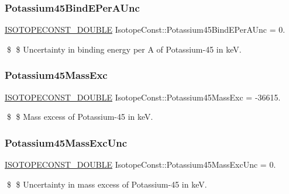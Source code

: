 \subsubsection{\texorpdfstring{Potassium45\+Bind\+E\+Per\+A\+Unc}{Potassium45BindEPerAUnc}}
{\footnotesize\ttfamily \mbox{\hyperlink{group___isotope_const-_macros_ga8f45a7272ce02c0b4c65c44636ed719a}{I\+S\+O\+T\+O\+P\+E\+C\+O\+N\+S\+T\+\_\+\+D\+O\+U\+B\+LE}} Isotope\+Const\+::\+Potassium45\+Bind\+E\+Per\+A\+Unc = 0.}

\$ \$ Uncertainty in binding energy per A of Potassium-\/45 in keV. \mbox{\label{group___isotope_const-_potassium-_k45_gaa8e3ed98c9a9b88cd99843bd8a43a698}} 
\subsubsection{\texorpdfstring{Potassium45\+Mass\+Exc}{Potassium45MassExc}}
{\footnotesize\ttfamily \mbox{\hyperlink{group___isotope_const-_macros_ga8f45a7272ce02c0b4c65c44636ed719a}{I\+S\+O\+T\+O\+P\+E\+C\+O\+N\+S\+T\+\_\+\+D\+O\+U\+B\+LE}} Isotope\+Const\+::\+Potassium45\+Mass\+Exc = -\/36615.}

\$ \$ Mass excess of Potassium-\/45 in keV. \mbox{\label{group___isotope_const-_potassium-_k45_ga9a32d4db243f8490e4954a5c9d9e9b9a}} 
\subsubsection{\texorpdfstring{Potassium45\+Mass\+Exc\+Unc}{Potassium45MassExcUnc}}
{\footnotesize\ttfamily \mbox{\hyperlink{group___isotope_const-_macros_ga8f45a7272ce02c0b4c65c44636ed719a}{I\+S\+O\+T\+O\+P\+E\+C\+O\+N\+S\+T\+\_\+\+D\+O\+U\+B\+LE}} Isotope\+Const\+::\+Potassium45\+Mass\+Exc\+Unc = 0.}

\$ \$ Uncertainty in mass excess of Potassium-\/45 in keV. \mbox{\label{group___isotope_const-_potassium-_k45_ga3b7d3d1ecbb844aa5898ca72fa20d646}} 
